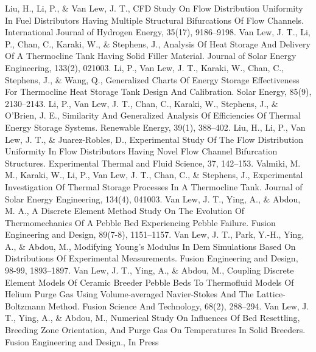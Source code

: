  {Liu, H., Li, P., \& Van Lew, J. T., CFD Study On Flow Distribution Uniformity In Fuel Distributors Having Multiple Structural Bifurcations Of Flow Channels. International Journal of Hydrogen Energy, 35(17), 9186–9198.}
 {Van Lew, J. T., Li, P., Chan, C., Karaki, W., \& Stephens, J., Analysis Of Heat Storage And Delivery Of A Thermocline Tank Having Solid Filler Material. Journal of Solar Energy Engineering, 133(2), 021003.}
 {Li, P., Van Lew, J. T., Karaki, W., Chan, C., Stephens, J., \& Wang, Q., Generalized Charts Of Energy Storage Effectiveness For Thermocline Heat Storage Tank Design And Calibration. Solar Energy, 85(9), 2130–2143.}
 {Li, P., Van Lew, J. T., Chan, C., Karaki, W., Stephens, J., \& O’Brien, J. E., Similarity And Generalized Analysis Of Efficiencies Of Thermal Energy Storage Systems. Renewable Energy, 39(1), 388–402.}
 {Liu, H., Li, P., Van Lew, J. T., \& Juarez-Robles, D., Experimental Study Of The Flow Distribution Uniformity In Flow Distributors Having Novel Flow Channel Bifurcation Structures. Experimental Thermal and Fluid Science, 37, 142–153.}
 {Valmiki, M. M., Karaki, W., Li, P., Van Lew, J. T., Chan, C., \& Stephens, J., Experimental Investigation Of Thermal Storage Processes In A Thermocline Tank. Journal of Solar Energy Engineering, 134(4), 041003.}
 {Van Lew, J. T., Ying, A., \& Abdou, M. A., A Discrete Element Method Study On The Evolution Of Thermomechanics Of A Pebble Bed Experiencing Pebble Failure. Fusion Engineering and Design, 89(7-8), 1151–1157.}
 {Van Lew, J. T., Park, Y.-H., Ying, A., \& Abdou, M., Modifying Young’s Modulus In Dem Simulations Based On Distributions Of Experimental Measurements. Fusion Engineering and Design, 98-99, 1893–1897.}
 {Van Lew, J. T., Ying, A., \& Abdou, M., Coupling Discrete Element Models Of Ceramic Breeder Pebble Beds To Thermofluid Models Of Helium Purge Gas Using Volume-averaged Navier-Stokes And The Lattice-Boltzmann Method. Fusion Science And Technology, 68(2), 288–294.}
 {Van Lew, J. T., Ying, A., \& Abdou, M., Numerical Study On Influences Of Bed Resettling, Breeding Zone Orientation, And Purge Gas On Temperatures In Solid Breeders. Fusion Engineering and Design., In Press}